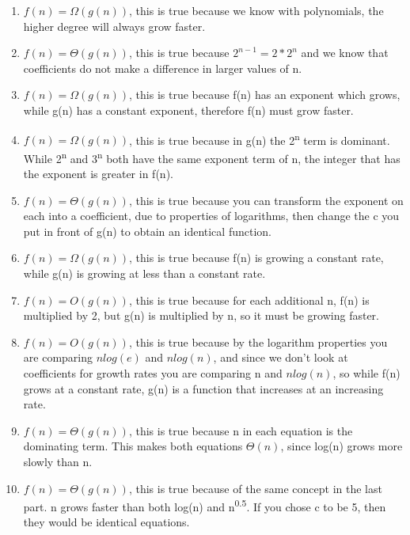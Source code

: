 \documentclass[]{article}
\begin{document}
\begin{enumerate}
\def\labelenumi{\alph{enumi})}
\item
  \(f(n) = \Omega(g(n))\), this is true because we know with
  polynomials, the higher degree will always grow faster.
\item
  \(f(n) = \Theta(g(n))\), this is true because \(2^{n-1} = 2 * 2^n\)
  and we know that coefficients do not make a difference in larger
  values of n.
\item
  \(f(n) = \Omega(g(n))\), this is true because f(n) has an exponent
  which grows, while g(n) has a constant exponent, therefore f(n) must
  grow faster.
\item
  \(f(n) = \Omega(g(n))\), this is true because in g(n) the
  2\textsuperscript{n} term is dominant. While 2\textsuperscript{n} and
  3\textsuperscript{n} both have the same exponent term of n, the
  integer that has the exponent is greater in f(n).
\item
  \(f(n) = \Theta(g(n))\), this is true because you can transform the
  exponent on each into a coefficient, due to properties of logarithms,
  then change the c you put in front of g(n) to obtain an identical
  function.
\item
  \(f(n) = \Omega(g(n))\), this is true because f(n) is growing a
  constant rate, while g(n) is growing at less than a constant rate.
\item
  \(f(n) = O(g(n))\), this is true because for each additional n, f(n)
  is multiplied by 2, but g(n) is multiplied by n, so it must be growing
  faster.
\item
  \(f(n) = O(g(n))\), this is true because by the logarithm properties
  you are comparing \(nlog(e)\) and \(nlog(n)\), and since we don't look
  at coefficients for growth rates you are comparing n and \(nlog(n)\),
  so while f(n) grows at a constant rate, g(n) is a function that
  increases at an increasing rate.
\item
  \(f(n) = \Theta(g(n))\), this is true because n in each equation is
  the dominating term. This makes both equations \(\Theta(n)\), since
  log(n) grows more slowly than n.
\item
  \(f(n) = \Theta(g(n))\), this is true because of the same concept in
  the last part. n grows faster than both log(n) and
  n\textsuperscript{0.5}. If you chose c to be 5, then they would be
  identical equations.
\end{enumerate}
\end{document}
